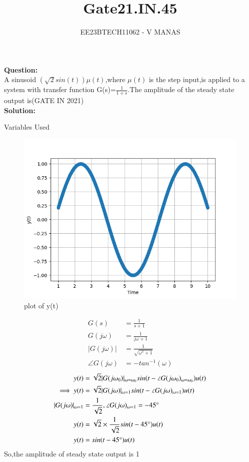 \documentclass[journal,12pt,twocolumn]{IEEEtran}
\theoremstyle{remark}
\begin{document}

\vspace{3cm}

\title{Gate21.IN.45}
\author{EE23BTECH11062 - V MANAS}
\maketitle
\newpage

\bigskip
\textbf{Question:}\\A sinusoid $(\sqrt{2}sin(t))\mu(t)$,where $\mu(t)$ is the step input,is applied to a system with transfer function G(s)=$\frac{1}{1+s}$.The amplitude of the steady state output is\hfill{(GATE IN 2021)}\\
\textbf{Solution:}
\begin{table}[h]
    \centering
    
    \caption{Variables Used}
    \label{tab:gate21.in.45}
\end{table}
\begin{figure}[h]
    \centering
    \includegraphics[width=1.0\linewidth]{figs/graph.png}
    \caption{plot of y(t)}
\end{figure}
\begin{align}
    G(s)&=\frac{1}{s+1}\\
    G(j\omega)&=\frac{1}{j\omega+1}\\
    |G(j\omega)|&=\frac{1}{\sqrt{\omega^2+1}}\\
    \angle G(j\omega)&=-tan^{-1}(\omega)
\end{align}
\begin{align}
    y(t)&=\sqrt{2}|G(j\omega_0)|_{\omega=\omega_0}sin(t-\angle G(j\omega_0)_{\omega=\omega_0})u(t)\\    
    \implies y(t)&=\sqrt{2}|G(j\omega)|_{\omega=1}sin(t-\angle G(j\omega)_{\omega=1})u(t)\\
    |G(j\omega)|_{\omega=1}&=\frac{1}{\sqrt{2}},\angle G(j\omega)_{\omega=1}=-45\degree\\
    y(t)&=\sqrt{2}\times\frac{1}{\sqrt{2}}sin(t-45\degree)u(t)\\
    y(t)&=sin(t-45\degree)u(t)
\end{align}
So,the amplitude of steady state output is 1
\end{document}
